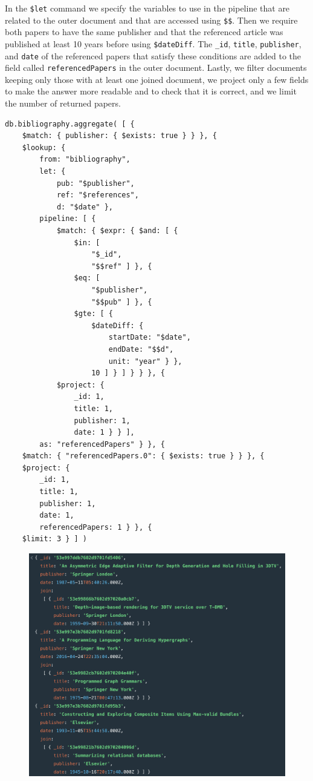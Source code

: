 \begin{enumerate}
    In the \verb|$let| command we specify the variables to use in the pipeline that are related to the outer document and that are accessed using \verb|$$|.
    Then we require both papers to have the same publisher and that the referenced article was published at least 10 years before using \verb|$dateDiff|.
    The \verb|_id|, \verb|title|, \verb|publisher|, and \verb|date| of the referenced papers that satisfy these conditions are added to the field called \verb|referencedPapers| in the outer document.
    Lastly, we filter documents keeping only those with at least one joined document, we project only a few fields to make the answer more readable and to check that it is correct, and we limit the number of returned papers.
    \begin{lstlisting}[label={lst:query9mongodb}]
 db.bibliography.aggregate( [ {
    $match: { publisher: { $exists: true } } }, {
    $lookup: {
        from: "bibliography",
        let: {
            pub: "$publisher",
            ref: "$references",
            d: "$date" },
        pipeline: [ {
            $match: { $expr: { $and: [ {
                $in: [
                    "$_id",
                    "$$ref" ] }, {
                $eq: [
                    "$publisher",
                    "$$pub" ] }, {
                $gte: [ {
                    $dateDiff: {
                        startDate: "$date",
                        endDate: "$$d",
                        unit: "year" } },
                    10 ] } ] } } }, {
            $project: {
                _id: 1,
                title: 1,
                publisher: 1,
                date: 1 } } ],
        as: "referencedPapers" } }, {
    $match: { "referencedPapers.0": { $exists: true } } }, {
    $project: {
        _id: 1,
        title: 1,
        publisher: 1,
        date: 1,
        referencedPapers: 1 } }, {
    $limit: 3 } ] )
    \end{lstlisting}
    \begin{figure}[H]
        \begin{center}
            \includegraphics[width=0.9\linewidth]{ImagesMongoDB/query9mongodb}

\end{center}
\end{figure}
\end{enumerate}
